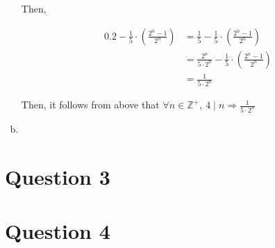 \documentclass[12pt]{article}
\begin{document}
\begin{enumerate}[a.]
    \bigskip

    Then,

    \begin{align}
        0.2 - \frac{1}{5} \cdot \left( \frac{2^n - 1}{2^n} \right) &= \frac{1}{5} - \frac{1}{5} \cdot \left( \frac{2^n - 1}{2^n} \right)\\
        &= \frac{2^n}{5 \cdot 2^n} - \frac{1}{5} \cdot \left( \frac{2^n - 1}{2^n} \right)\\
        &= \frac{1}{5 \cdot 2^n}
    \end{align}

    Then, it follows from above that $\forall n \in \mathbb{Z}^{+},\: 4 \mid n
    \Rightarrow \frac{1}{5 \cdot 2^n}$

    \item




\end{enumerate}

\section*{Question 3}

\section*{Question 4}
\end{document}
